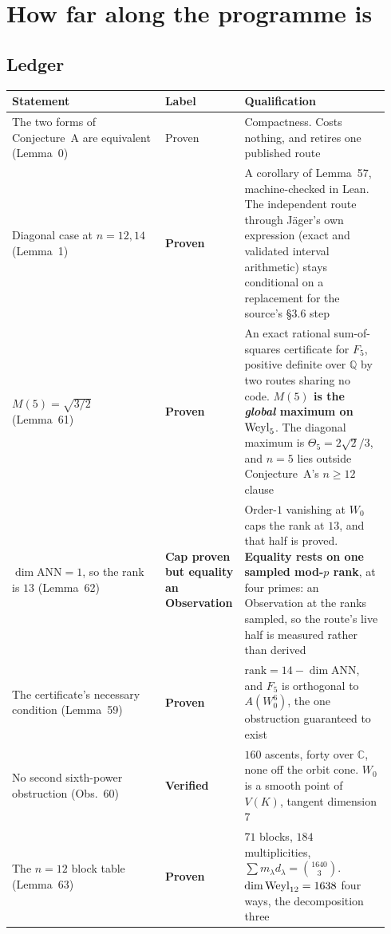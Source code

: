 \section{How far along the programme is}

\subsection{Ledger}\label{sec:ledger}

\begin{longtable}{@{}p{0.40\linewidth}p{0.16\linewidth}p{0.38\linewidth}@{}}
\toprule
\textbf{Statement} & \textbf{Label} & \textbf{Qualification} \\
\midrule
\endhead
The two forms of Conjecture~A are equivalent (Lemma~0) & Proven & Compactness. Costs nothing, and retires one published route \\
Diagonal case at $n=12,14$ (Lemma~1) & \textbf{Proven} & A corollary of Lemma~57, machine-checked in Lean. The independent route through J\"ager's own expression (exact and validated interval arithmetic) stays conditional on a replacement for the source's \S3.6 step \\
$M(5)=\sqrt{3/2}$ (Lemma~61) & \textbf{Proven} & An exact rational sum-of-squares certificate for $F_5$, positive definite over $\mathbb Q$ by two routes sharing no code. \textbf{$M(5)$ is the \emph{global} maximum on $\mathrm{Weyl}_5$}. The diagonal maximum is $\Theta_5=2\sqrt2/3$, and $n=5$ lies outside Conjecture~A's $n\ge12$ clause \\
$\dim\mathrm{ANN}=1$, so the rank is $13$ (Lemma~62) & \textbf{Cap proven but equality an Observation} & Order-$1$ vanishing at $W_0$ caps the rank at $13$, and that half is proved. \textbf{Equality rests on one sampled mod-$p$ rank}, at four primes: an Observation at the ranks sampled, so the route's live half is measured rather than derived \\
The certificate's necessary condition (Lemma~59) & \textbf{Proven} & $\mathrm{rank}=14-\dim\mathrm{ANN}$, and $F_5$ is orthogonal to $A(W_0^6)$, the one obstruction guaranteed to exist \\
No second sixth-power obstruction (Obs.~60) & \textbf{Verified} & $160$ ascents, forty over $\mathbb C$, none off the orbit cone. $W_0$ is a smooth point of $V(K)$, tangent dimension $7$ \\
The $n=12$ block table (Lemma~63) & \textbf{Proven} & $71$ blocks, $184$ multiplicities, $\sum m_\lambda d_\lambda=\binom{1640}3$. $\dim\mathrm{Weyl}_{12}=1638$ four ways, the decomposition three \\

\end{longtable}
